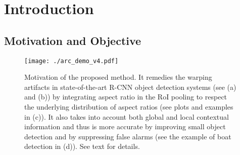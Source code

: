 \documentclass[10pt,twocolumn,letterpaper]{article}
\begin{document}
\vspace{-5mm}
\section{Introduction}

\vspace{-1mm}
\subsection{Motivation and Objective}
\vspace{-1mm}
\begin{figure}
\centering
{\texttt{[image: ./arc\_demo\_v4.pdf]}}
\caption{Motivation of the proposed method. It remedies the warping artifacts in state-of-the-art R-CNN object detection systems (see (a) and (b)) by integrating aspect ratio in the RoI pooling to respect the underlying distribution of aspect ratios  (see plots and examples in (c)). It also takes into account both global and local contextual information and thus is more accurate by improving small object detection and by suppressing false alarms (see the example of boat detection in (d)). See text for details. \vspace{-5mm}
}
\label{fig:demo}
\end{figure} 
\end{document}
